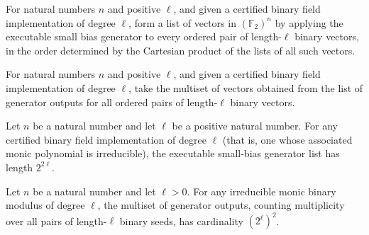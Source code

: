 \begin{definition}
\label{FABL.executableSmallBiasGeneratorList}
\leanok
{}
For natural numbers $n$ and positive $\ell$, and given a certified binary field
implementation of degree $\ell$, form a list of vectors in $(\mathbb{F}_2)^n$ by
applying the executable small bias generator to every ordered pair of length-$\ell$
binary vectors, in the order determined by the Cartesian product of the lists of all
such vectors.
\end{definition}

\begin{definition}
\label{FABL.executableSmallBiasGeneratorMultiset}
\leanok
{}
For natural numbers $n$ and positive $\ell$, and given a certified binary field
implementation of degree $\ell$, take the multiset of vectors obtained from the list of
generator outputs for all ordered pairs of length-$\ell$ binary vectors.
\end{definition}

\begin{theorem}
\label{FABL.length_executableSmallBiasGeneratorList}
\leanok
{}
Let $n$ be a natural number and let $\ell$ be a positive natural number. For any
certified binary field implementation of degree $\ell$ (that is, one whose associated
monic polynomial is irreducible), the executable small-bias generator list has length
$2^{2\ell}$.
\end{theorem}

\begin{theorem}
\label{FABL.executableSmallBiasGeneratorMultiset_card}
\leanok
{}
Let $n$ be a natural number and let $\ell>0$. For any irreducible monic binary modulus
of degree $\ell$, the multiset of generator outputs, counting multiplicity over all
pairs of length-$\ell$ binary seeds, has cardinality $(2^\ell)^2$.
\end{theorem}

